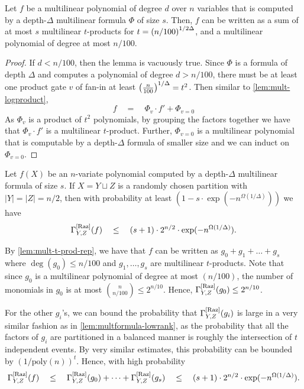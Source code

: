 \begin{lemma}\label{lem:mult-t-prod-rep}
Let $f$ be a multilinear polynomial of degree $d$ over $n$ variables that is computed by a depth-$\Delta$ multilinear formula $\Phi$ of size $s$. 
Then, $f$ can be written as a sum of at most $s$ multilinear $t$-products for $t = \left(n/100\right)^{1/2\Delta}$, and a multilinear polynomial of degree at most $n/100$.  
\end{lemma}
\begin{proof}
If $d < n/100$, then the lemma is vacuously true. 
Since $\Phi$ is a formula of depth $\Delta$ and computes a polynomial of degree $d > n/100$, there must be at least one product gate $v$ of fan-in at least $\left(\frac{n}{100}\right)^{1/\Delta} = t^2$. 
Then similar to \autoref{lem:mult-logproduct}, 
$$
f \quad=\quad \Phi_v \cdot f'  + \Phi_{v=0}
$$
As $\Phi_v$ is a product of $t^2$ polynomials, by grouping the factors together we have that $\Phi_v \cdot f'$ is a multilinear $t$-product. 
Further, $\Phi_{v=0}$ is a multilinear polynomial that is computable by a depth-$\Delta$ formula of smaller size and we can induct on $\Phi_{v=0}$. 
\end{proof}

\begin{lemma}\label{lem:mult-const-depth-upper-bound}
Let $f(X)$ be an $n$-variate polynomial computed by a depth-$\Delta$ multilinear formula of size $s$. 
If $X = Y \sqcup Z$ is a randomly chosen partition with $|Y| = |Z| = n/2$, then with probability at least $(1 - s \cdot \exp({-n^{\Omega(1/\Delta)}}))$ we have
$$
\Gamma^{\mathrm{[Raz]}}_{Y,Z}(f) \quad\leq\quad (s+1) \cdot 2^{n/2} \cdot \exp(-n^{\Omega(1/\Delta)}).
$$
\end{lemma}
\begin{proof-sketch}
By \autoref{lem:mult-t-prod-rep}, we have that $f$ can be written as $g_0 + g_1 + \dots + g_s$ where $\deg(g_0) \leq n/100$ and $g_1,\dots, g_s$ are multilinear $t$-products. 
Note that since $g_0$ is a multilinear polynomial of degree at most $(n/100)$, the number of monomials in $g_0$ is at most $\binom{n}{n/100} \leq 2^{n/10}$. 
Hence, $\Gamma^{\mathrm{[Raz]}}_{Y,Z}(g_0) \leq 2^{n/10}$. 

For the other $g_i$'s, we can bound the probability that $\Gamma^{\mathrm{[Raz]}}_{Y,Z}(g_i)$ is large in a very similar fashion as in \autoref{lem:multformula-lowrank}, as the probability that all the factors of $g_i$ are partitioned in a balanced manner is roughly the intersection of $t$ independent events. 
By very similar estimates, this probability can be bounded by $(1/\mathrm{poly}(n))^t$. 
Hence, with high probability 
$$
\Gamma^{\mathrm{[Raz]}}_{Y,Z}(f) \quad \leq \quad \Gamma^{\mathrm{[Raz]}}_{Y,Z}(g_0) + \dots + \Gamma^{\mathrm{[Raz]}}_{Y,Z}(g_s) \quad \leq \quad (s+1)\cdot 2^{n/2} \cdot \exp(-n^{\Omega(1/\Delta)}).
$$
\end{proof-sketch}

